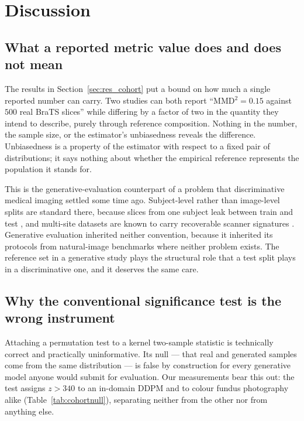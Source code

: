 \section{Discussion}
\label{sec:discussion}

\subsection{What a reported metric value does and does not mean}

The results in Section~\ref{sec:res_cohort} put a bound on how much a single
reported number can carry. Two studies can both report ``MMD$^2 = 0.15$ against
$500$ real BraTS slices'' while differing by a factor of two in the quantity
they intend to describe, purely through reference composition. Nothing in the
number, the sample size, or the estimator's unbiasedness reveals the
difference. Unbiasedness is a property of the estimator with respect to a fixed
pair of distributions; it says nothing about whether the empirical reference
represents the population it stands for.

This is the generative-evaluation counterpart of a problem that discriminative
medical imaging settled some time ago. Subject-level rather than image-level
splits are standard there, because slices from one subject leak between train
and test \citep{varoquaux2022machine}, and multi-site datasets are known to
carry recoverable scanner signatures \citep{glocker2019machine}. Generative
evaluation inherited neither convention, because it inherited its protocols from
natural-image benchmarks where neither problem exists. The reference set in a
generative study plays the structural role that a test split plays in a
discriminative one, and it deserves the same care.

\subsection{Why the conventional significance test is the wrong instrument}

Attaching a permutation test to a kernel two-sample statistic is technically
correct and practically uninformative. Its null --- that real and generated
samples come from the same distribution --- is false by construction for every
generative model anyone would submit for evaluation. Our measurements bear this
out: the test assigns $z > 340$ to an in-domain DDPM and to colour fundus
photography alike (Table~\ref{tab:cohortnull}), separating neither from the
other nor from anything else.

